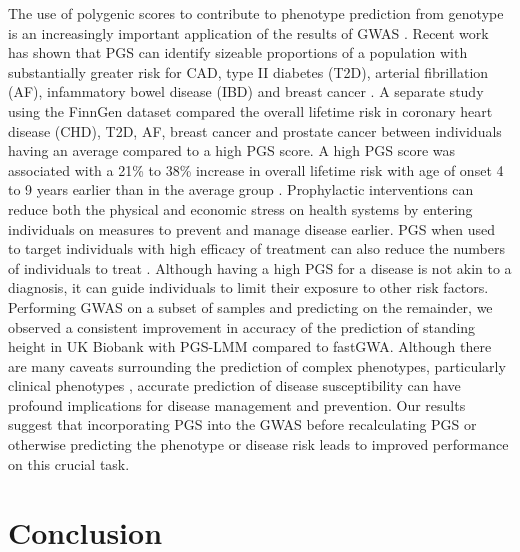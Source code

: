 \documentclass[doublespacing]{bmcart}
\begin{document}

The use of polygenic scores to contribute to phenotype prediction from genotype is an increasingly important application of the results of GWAS \cite{martin2019predicting}. Recent work has shown that PGS can identify sizeable proportions of a population with substantially greater risk for CAD, type II diabetes (T2D), arterial fibrillation (AF), infammatory bowel disease (IBD) and breast cancer \cite{khera2018genome}. A separate study using the FinnGen dataset compared the overall lifetime risk in coronary heart disease (CHD), T2D, AF, breast cancer and prostate cancer between individuals having an average compared to a high PGS score. A high PGS score was associated with a 21\% to 38\% increase in overall lifetime risk with age of onset 4 to 9 years earlier than in the average group \cite{mars2020polygenic}. Prophylactic interventions can reduce both the physical and economic stress on health systems by entering individuals on measures to prevent and manage disease earlier. PGS when used to target individuals with high efficacy of treatment can also reduce the numbers of individuals to treat \cite{gibson2019utilization}. Although having a high PGS for a disease is not akin to a diagnosis, it can guide individuals to limit their exposure to other risk factors. Performing GWAS on a subset of samples and predicting on the remainder, we observed a consistent improvement in accuracy of the prediction of standing height in UK Biobank with PGS-LMM compared to fastGWA. Although there are many caveats surrounding the prediction of complex phenotypes, particularly clinical phenotypes \cite{duncan2019analysis}, accurate prediction of disease susceptibility can have profound implications for disease management and prevention. Our results suggest that incorporating PGS into the GWAS before recalculating PGS or otherwise predicting the phenotype or disease risk leads to improved performance on this crucial task.


\section*{Conclusion}
\end{document}
